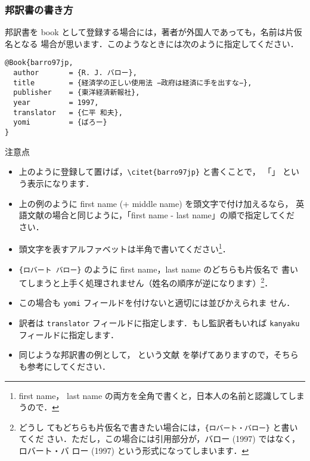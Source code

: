 \documentclass[a4j,10pt]{jarticle}
\begin{document}
\subsubsection{邦訳書の書き方}
\label{sec:hoyakusho}

邦訳書を book として登録する場合には，著者が外国人であっても，名前は片仮名となる
場合が思います．このようなときには次のように指定してください．\\

\begin{screen}
 \begin{verbatim}
@Book{barro97jp,
  author       = {R. J. バロー},
  title        = {経済学の正しい使用法 −政府は経済に手を出すな−},
  publisher    = {東洋経済新報社},
  year         = 1997,
  translator   = {仁平 和夫},
  yomi         = {ばろー}
}
 \end{verbatim}
\end{screen}

注意点
\begin{itemize}
 \item 上のように登録して置けば，\verb|\citet{barro97jp}| と書くことで，
       「\citet{barro97jp}」 という表示になります．
 \item 上の例のように first name (+ middle name) を頭文字で付け加えるなら，
       英語文献の場合と同じように，「first name - last name」の順で指定してくだ
       さい．
 \item 頭文字を表すアルファベットは半角で書いてください\footnote{first name，
       last name の両方を全角で書くと，日本人の名前と認識してしまうので．}．
 \item \verb|{ロバート バロー}| のように first name，last name のどちらも片仮名で
       書いてしまうと上手く処理されません（姓名の順序が逆になります）\footnote{どうし
       てもどちらも片仮名で書きたい場合には，\verb|{ロバート・バロー}| と書いてくだ
       さい．ただし，この場合には引用部分が，バロー (1997) ではなく，ロバート・バ
       ロー (1997) という形式になってしまいます．}．
 \item この場合も \texttt{yomi} フィールドを付けないと適切には並びかえられま
       せん．
 \item 訳者は \texttt{translator} フィールドに指定します．もし監訳者もいれば
       \texttt{kanyaku} フィールドに指定します．
 \item 同じような邦訳書の例として，\cite{markusen99jp:trade_vol_1} という文献
       を挙げてありますので，そちらも参考にしてください．
\end{itemize}
\end{document}
